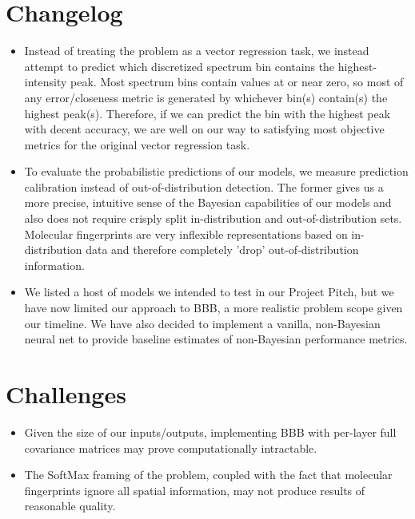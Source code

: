 \documentclass{article}
\begin{document}
\section{Changelog}
\begin{itemize}
    \item Instead of treating the problem as a vector regression task, we instead attempt to predict which discretized spectrum bin contains the highest-intensity peak. Most spectrum bins contain values at or near zero, so most of any error/closeness metric is generated by whichever bin(s) contain(s) the highest peak(s). Therefore, if we can predict the bin with the highest peak with decent accuracy, we are well on our way to satisfying most objective metrics for the original vector regression task.
    \item To evaluate the probabilistic predictions of our models, we measure prediction calibration instead of out-of-distribution detection. The former gives us a more precise, intuitive sense of the Bayesian capabilities of our models and also does not require crisply split in-distribution and out-of-distribution sets. Molecular fingerprints are very inflexible representations based on in-distribution data and therefore completely 'drop' out-of-distribution information.

    \item We listed a host of models we intended to test in our Project Pitch, but we have now limited our approach to BBB, a more realistic problem scope given our timeline. We have also decided to implement a vanilla, non-Bayesian neural net to provide baseline estimates of non-Bayesian performance metrics.
\end{itemize}

\section{Challenges}
\begin{itemize}
    \item Given the size of our inputs/outputs, implementing BBB with per-layer full covariance matrices may prove computationally intractable.
    \item The SoftMax framing of the problem, coupled with the fact that molecular fingerprints ignore all spatial information, may not produce results of reasonable quality. 
\end{itemize}
\end{document}
